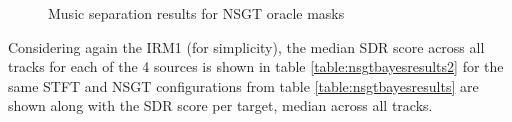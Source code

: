 \documentclass[letter,12pt,notitlepage]{article}
\begin{document}
\begin{figure}[ht]
	\centering
{}
\caption{Music separation results for NSGT oracle masks}
\label{fig:nsgtboxplots}
\end{figure}

Considering again the IRM1 (for simplicity), the median SDR score across all tracks for each of the 4 sources is shown in table \ref{table:nsgtbayesresults2} for the same STFT and NSGT configurations from table \ref{table:nsgtbayesresults} are shown along with the SDR score per target, median across all tracks.
\end{document}
